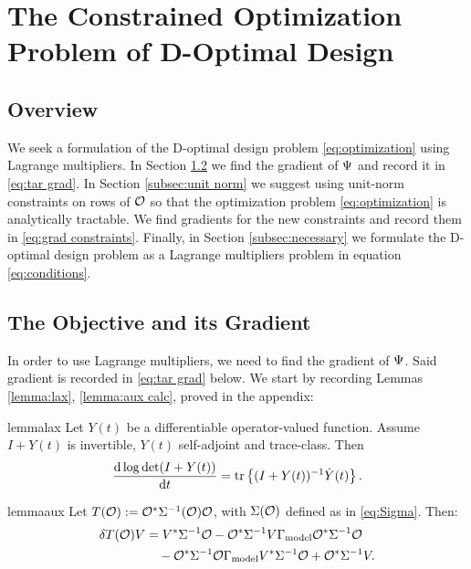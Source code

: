 \documentclass{amsart}
\numberwithin{equation}{section}
\begin{document}
\section{The Constrained Optimization Problem of D-Optimal Design}\label{section:D and grad}

\subsection{Overview}
We seek a formulation of the D-optimal design problem
\eqref{eq:optimization} using Lagrange multipliers. In Section
\ref{section:objective} we find the gradient of $\Psi$ and record it
in \eqref{eq:tar grad}. In Section \ref{subsec:unit norm} we suggest
using unit-norm constraints on rows of $\mathcal{O}$ so that the optimization
problem \eqref{eq:optimization} is analytically tractable. We find
gradients for the new constraints and record them in \eqref{eq:grad
  constraints}. Finally, in Section \ref{subsec:necessary} we
formulate the D-optimal design problem as a Lagrange multipliers
problem in equation \eqref{eq:conditions}.


\subsection{The Objective and its Gradient}\label{section:objective}
In order to use Lagrange multipliers, we need to find the gradient of
$\Psi$. Said gradient is recorded in \eqref{eq:tar grad} below. We
start by recording Lemmas \ref{lemma:lax}, \ref{lemma:aux calc},
proved in the appendix:

\begin{restatable*}{lemma}{lax}\label{lemma:lax}
  Let $Y(t)$ be a differentiable operator-valued function. Assume 
  $I+Y(t)$ is invertible, $Y(t)$ self-adjoint and trace-class. Then
  \begin{equation*}
    \frac{\text{\textup{d}} \log \det (I+Y(t))}{\text{\textup{d}} t} = \textup{tr}\left \{(I+Y(t))^{-1} \dot{Y}(t) \right \}.
  \end{equation*}
\end{restatable*}

\begin{restatable*}{lemma}{aux}\label{lemma:aux calc}
  Let $T(\mathcal{O}) := \mathcal{O}^* \Sigma^{-1}(\mathcal{O})\mathcal{O}$, with $\Sigma(\mathcal{O})$
  defined as in \eqref{eq:Sigma}. Then:
  \begin{align*}
    \delta T(\mathcal{O})V &= V^* \Sigma^{-1} \mathcal{O} 
    - \mathcal{O}^*\Sigma^{-1} V\Gamma_{\textup{model}} \mathcal{O}^* \Sigma^{-1}\mathcal{O} \\
    &\ \ \ - \mathcal{O}^* \Sigma^{-1} \mathcal{O} \Gamma_{\textup{model}} V^* \Sigma^{-1}\mathcal{O}
    + \mathcal{O}^* \Sigma^{-1} V.
  \end{align*}
\end{restatable*}
\end{document}

